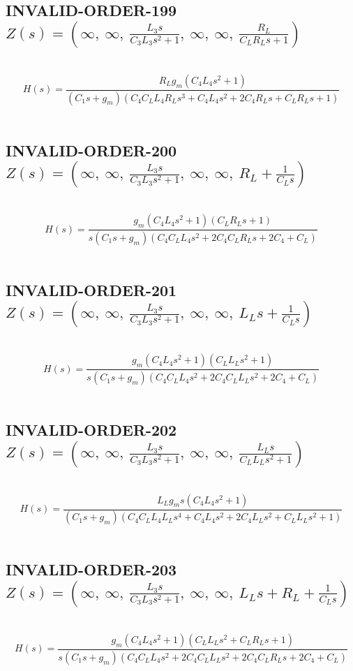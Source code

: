 \documentclass{article}
\begin{document}
\subsection{INVALID-ORDER-199 $Z(s) = \left( \infty, \  \infty, \  \frac{L_{3} s}{C_{3} L_{3} s^{2} + 1}, \  \infty, \  \infty, \  \frac{R_{L}}{C_{L} R_{L} s + 1}\right)$ } \ 
\textbf{\[H(s) = \frac{R_{L} g_{m} \left(C_{4} L_{4} s^{2} + 1\right)}{\left(C_{1} s + g_{m}\right) \left(C_{4} C_{L} L_{4} R_{L} s^{3} + C_{4} L_{4} s^{2} + 2 C_{4} R_{L} s + C_{L} R_{L} s + 1\right)}\] } \ 
\subsection{INVALID-ORDER-200 $Z(s) = \left( \infty, \  \infty, \  \frac{L_{3} s}{C_{3} L_{3} s^{2} + 1}, \  \infty, \  \infty, \  R_{L} + \frac{1}{C_{L} s}\right)$ } \ 
\textbf{\[H(s) = \frac{g_{m} \left(C_{4} L_{4} s^{2} + 1\right) \left(C_{L} R_{L} s + 1\right)}{s \left(C_{1} s + g_{m}\right) \left(C_{4} C_{L} L_{4} s^{2} + 2 C_{4} C_{L} R_{L} s + 2 C_{4} + C_{L}\right)}\] } \ 
\subsection{INVALID-ORDER-201 $Z(s) = \left( \infty, \  \infty, \  \frac{L_{3} s}{C_{3} L_{3} s^{2} + 1}, \  \infty, \  \infty, \  L_{L} s + \frac{1}{C_{L} s}\right)$ } \ 
\textbf{\[H(s) = \frac{g_{m} \left(C_{4} L_{4} s^{2} + 1\right) \left(C_{L} L_{L} s^{2} + 1\right)}{s \left(C_{1} s + g_{m}\right) \left(C_{4} C_{L} L_{4} s^{2} + 2 C_{4} C_{L} L_{L} s^{2} + 2 C_{4} + C_{L}\right)}\] } \ 
\subsection{INVALID-ORDER-202 $Z(s) = \left( \infty, \  \infty, \  \frac{L_{3} s}{C_{3} L_{3} s^{2} + 1}, \  \infty, \  \infty, \  \frac{L_{L} s}{C_{L} L_{L} s^{2} + 1}\right)$ } \ 
\textbf{\[H(s) = \frac{L_{L} g_{m} s \left(C_{4} L_{4} s^{2} + 1\right)}{\left(C_{1} s + g_{m}\right) \left(C_{4} C_{L} L_{4} L_{L} s^{4} + C_{4} L_{4} s^{2} + 2 C_{4} L_{L} s^{2} + C_{L} L_{L} s^{2} + 1\right)}\] } \ 
\subsection{INVALID-ORDER-203 $Z(s) = \left( \infty, \  \infty, \  \frac{L_{3} s}{C_{3} L_{3} s^{2} + 1}, \  \infty, \  \infty, \  L_{L} s + R_{L} + \frac{1}{C_{L} s}\right)$ } \ 
\textbf{\[H(s) = \frac{g_{m} \left(C_{4} L_{4} s^{2} + 1\right) \left(C_{L} L_{L} s^{2} + C_{L} R_{L} s + 1\right)}{s \left(C_{1} s + g_{m}\right) \left(C_{4} C_{L} L_{4} s^{2} + 2 C_{4} C_{L} L_{L} s^{2} + 2 C_{4} C_{L} R_{L} s + 2 C_{4} + C_{L}\right)}\] } \ 
\end{document}
